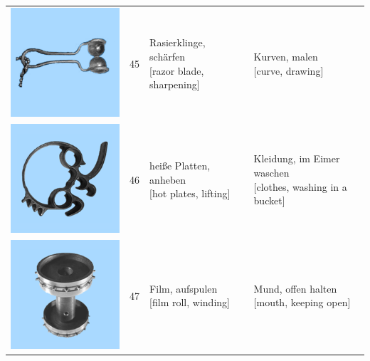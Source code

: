 \documentclass[
  english,
  doc,12pt,twoside,floatsintext]{apa7}
\begin{document}
\begin{center}
\begin{ThreePartTable}
{\begin{longtable}{llll}
\includegraphics[valign=c, scale=0.23]{../materials/unfamiliar/45.png} & 45 & \makecell[l]{Rasierklinge, schärfen\\{[razor blade, sharpening]}} & \makecell[l]{Kurven, malen\\{[curve, drawing]}}\\
\includegraphics[valign=c, scale=0.23]{../materials/unfamiliar/46.png} & 46 & \makecell[l]{heiße Platten, anheben\\{[hot plates, lifting]}} & \makecell[l]{Kleidung, im Eimer waschen\\{[clothes, washing in a bucket]}}\\
\includegraphics[valign=c, scale=0.23]{../materials/unfamiliar/47.png} & 47 & \makecell[l]{Film, aufspulen\\{[film roll, winding]}} & \makecell[l]{Mund, offen halten\\{[mouth, keeping open]}}\\

\end{longtable}}
\end{ThreePartTable}
\end{center}
\end{document}
